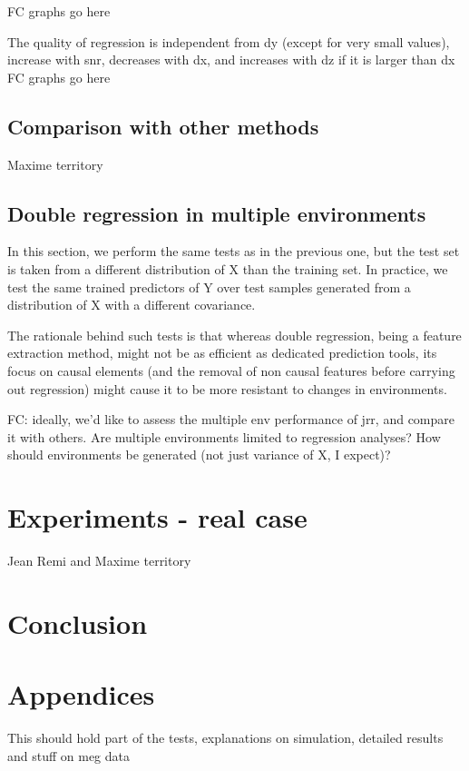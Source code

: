 \documentclass{article}
\begin{document}
FC graphs go here

The quality of regression is independent from dy (except for very small values), increase with snr, decreases with dx, and increases with dz if it is larger than dx 
FC graphs go here

\subsection{Comparison with other methods}
Maxime territory

\subsection{Double regression in multiple environments}
In this section, we perform the same tests as in the previous one, but the test set is taken from a different distribution of X than the training set. In practice, we test the same trained predictors of Y over test samples generated from a distribution of X with a different covariance.

The rationale behind such tests is that whereas double regression, being a feature extraction method, might not be as efficient as dedicated prediction tools, its focus on causal elements (and the removal of non causal features before carrying out regression) might cause it to be more resistant to changes in environments. 

FC: ideally, we'd like to assess the multiple env performance of jrr, and compare it with others. Are multiple environments limited to regression analyses? How should environments be generated (not just variance of X, I expect)?


\section{Experiments - real case}
Jean Remi and Maxime territory

\section{Conclusion}


\clearpage
\newpage




\section{Appendices}

This should hold part of the tests, explanations on simulation, detailed results and stuff on meg data
\end{document}
